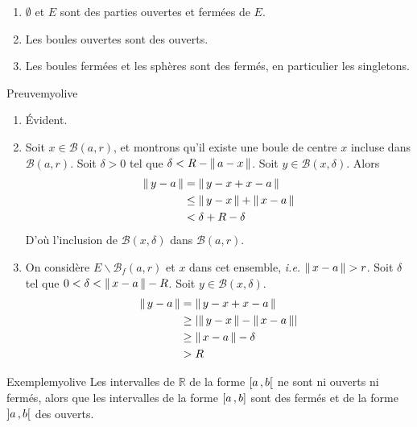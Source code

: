     \begin{prop}{}{}
        \begin{enumerate}
            \item $\emptyset$ et $E$ sont des parties ouvertes et fermées de $E$.
            \item Les boules ouvertes sont des ouverts.
            \item Les boules fermées et les sphères sont des fermés, en particulier les singletons.
        \end{enumerate}
    \end{prop}

    \begin{demo}{Preuve}{myolive}
        \begin{enumerate}
            \item Évident.
            \item Soit $x \in \mathcal{B}(a,r)$, et montrons qu’il existe une boule de centre $x$ incluse dans $\mathcal{B}(a,r)$. Soit $\delta > 0$ tel que $\delta < R - \left\lVert\,a-x\,\right\rVert$. Soit $y \in \mathcal{B}(x,\delta)$. Alors 
            \begin{align*}
                \left\lVert\,y - a\,\right\rVert 
                &= \left\lVert\,y - x + x - a\,\right\rVert \\
                &\leq \left\lVert\,y - x\,\right\rVert + \left\lVert\,x-a\,\right\rVert \\
                &< \delta + R - \delta
            \end{align*}
            D’où l’inclusion de $\mathcal{B}(x,\delta)$ dans $\mathcal{B}(a,r)$. 
            \item On considère $E \backslash \mathcal{B}_f(a,r)$ et $x$ dans cet ensemble, \textit{i.e.} $\left\lVert\,x-a\,\right\rVert > r$. Soit $\delta$ tel que $0 < \delta < \left\lVert\,x-a\,\right\rVert - R$. Soit $y \in \mathcal{B}(x,\delta)$. 
            \begin{align*}
                \left\lVert\,y-a\,\right\rVert 
                &= \left\lVert\,y - x + x - a\,\right\rVert \\
                &\geq \left\lvert \left\lVert\,y-x\,\right\rVert - \left\lVert\,x - a\,\right\rVert\right\rvert \\
                &\geq \left\lVert\,x-a\,\right\rVert - \delta \\
                &> R 
            \end{align*}
        \end{enumerate}
    \end{demo}

    \begin{omed}{Exemple}{myolive}
        Les intervalles de $\mathbb{R}$ de la forme $\left[ a \, , b \right[$ ne sont ni ouverts ni fermés, alors que les intervalles de la forme $\left[ a \, , b \right]$ sont des fermés et de la forme $\left] a \, , b \right[$ des ouverts.
    \end{omed}

